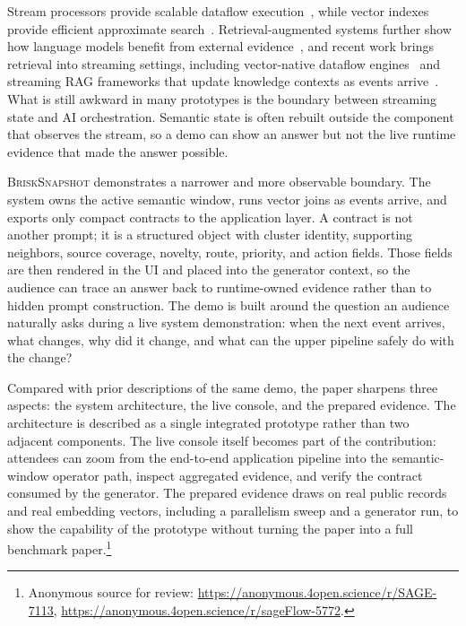 \documentclass[sigconf,anonymous]{acmart}
\newcommand{\system}{\textsc{BriskSnapshot}}
\begin{document}
Stream processors provide scalable dataflow execution~\cite{akidau2015dataflow,carbone2015apache}, while vector indexes provide efficient approximate search~\cite{jegou2011product,johnson2019billion,malkov2020efficient}. Retrieval-augmented systems further show how language models benefit from external evidence~\cite{lewis2020rag,guu2020realm}, and recent work brings retrieval into streaming settings, including vector-native dataflow engines~\cite{lu2025vectraflow} and streaming RAG frameworks that update knowledge contexts as events arrive~\cite{sankaradas2024streamingrag}. What is still awkward in many prototypes is the boundary between streaming state and AI orchestration. Semantic state is often rebuilt outside the component that observes the stream, so a demo can show an answer but not the live runtime evidence that made the answer possible.

\system{} demonstrates a narrower and more observable boundary. The system owns the active semantic window, runs vector joins as events arrive, and exports only compact contracts to the application layer. A contract is not another prompt; it is a structured object with cluster identity, supporting neighbors, source coverage, novelty, route, priority, and action fields. Those fields are then rendered in the UI and placed into the generator context, so the audience can trace an answer back to runtime-owned evidence rather than to hidden prompt construction. The demo is built around the question an audience naturally asks during a live system demonstration: when the next event arrives, what changes, why did it change, and what can the upper pipeline safely do with the change?

Compared with prior descriptions of the same demo, the paper sharpens three aspects: the system architecture, the live console, and the prepared evidence. The architecture is described as a single integrated prototype rather than two adjacent components. The live console itself becomes part of the contribution: attendees can zoom from the end-to-end application pipeline into the semantic-window operator path, inspect aggregated evidence, and verify the contract consumed by the generator. The prepared evidence draws on real public records and real embedding vectors, including a parallelism sweep and a generator run, to show the capability of the prototype without turning the paper into a full benchmark paper.\footnote{Anonymous source for review: \url{https://anonymous.4open.science/r/SAGE-7113}, \url{https://anonymous.4open.science/r/sageFlow-5772}.}
\end{document}
